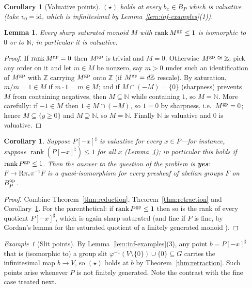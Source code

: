 \documentclass[11pt]{amsart}
\theoremstyle{plain}
\newtheorem{lemma}[theorem]{Lemma}
\newtheorem{corollary}[theorem]{Corollary}
\theoremstyle{remark}
\newtheorem{example}[theorem]{Example}
\theoremstyle{definition}
\numberwithin{equation}{section}
\begin{document}
\begin{corollary}[Valuative points]\label{cor:valuative}
$(\star)$ holds at every $b_x\in B_P$ which is valuative (take
$v_0=\mathrm{id}$, which is infinitesimal by
Lemma~\ref{lem:inf-examples}(1)).
\end{corollary}

\begin{lemma}\label{lem:rank1}
Every sharp saturated monoid $M$ with $\operatorname{rank}M^{\rm gp}\le1$
is isomorphic to $0$ or to $\mathbb N$; in particular it is valuative.
\end{lemma}
\begin{proof}
If $\operatorname{rank}M^{\rm gp}=0$ then $M^{\rm gp}$ is trivial and
$M=0$.  Otherwise $M^{\rm gp}\cong\mathbb Z$; pick any order on it and let
$m\in M$ be nonzero, say $m>0$ under such an identification of
$M^{\rm gp}$ with $\mathbb Z$ carrying $M^{\rm gp}$ onto $\mathbb Z$ (if
$M^{\rm gp}=d\mathbb Z$ rescale).  By saturation,
$m/m=1\in M$ if $m\cdot1=m\in M$; and if $M\cap(-M)=\{0\}$ (sharpness)
prevents $M$ from containing negatives, then $M\subseteq\mathbb N$ while
containing $1$, so $M=\mathbb N$.  More carefully: if $-1\in M$ then
$1\in M\cap(-M)$, so $1=0$ by sharpness, i.e.\ $M^{\rm gp}=0$; hence
$M\subseteq\{g\ge0\}$ and $M\supseteq\mathbb N$, so $M=\mathbb N$.
Finally $\mathbb N$ is valuative and $0$ is valuative.
\end{proof}

\begin{corollary}\label{cor:rank1}
Suppose $P[-x]^\sharp$ is valuative for every $x\in P$---for instance,
suppose $\operatorname{rank}(P[-x]^\sharp)\le1$ for all $x$
(Lemma~\ref{lem:rank1}); in particular this holds if
$\operatorname{rank}P^{\rm gp}\le1$.  Then the answer to the question of
the problem is \textbf{yes}: $F\to\mathrm R\pi_*\pi^{-1}F$ is a
quasi-isomorphism for every presheaf of abelian groups $F$ on
$B_P^{\rm op}$.
\end{corollary}
\begin{proof}
Combine Theorem~\ref{thm:reduction}, Theorem~\ref{thm:retraction} and
Corollary~\ref{cor:valuative}.  For the parenthetical: if
$\operatorname{rank}P^{\rm gp}\le1$ then so is the rank of every
quotient $P[-x]^\sharp$, which is again sharp saturated (and fine if $P$
is fine, by Gordan's lemma for the saturated quotient of a finitely
generated monoid \cite{Ogus}).
\end{proof}

\begin{example}[Slit points]\label{ex:slitpoints}
By Lemma~\ref{lem:inf-examples}(3), any point
$b=P[-x]^\sharp$ that is (isomorphic to) a group slit
$\varphi^{-1}(V\setminus\{0\})\cup\{0\}\subseteq G$ carries the
infinitesimal map $b\to V$, so $(\star)$ holds at $b$ by
Theorem~\ref{thm:retraction}.  Such points arise whenever $P$ is not
finitely generated.  Note the contrast with the fine case treated next.
\end{example}
\end{document}

